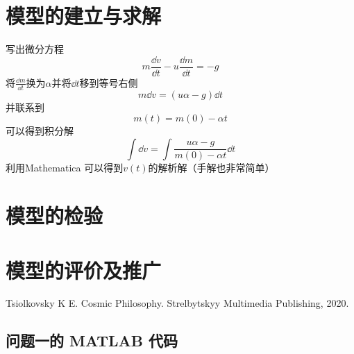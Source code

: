 \documentclass{JXUSTmodeling}
\begin{document}
\section{模型的建立与求解}\label{sec:5}
写出微分方程
\begin{equation}
    m\frac{\dd v}{\dd t} - u\frac{\dd m}{\dd t} = -g
\end{equation}
将$\frac{\dd m}{\dd t}$换为$\alpha$并将$\dd t$移到等号右侧
\begin{equation}
    m\dd v  = (u\alpha -g)\dd t
\end{equation}
并联系到
\begin{equation}
    m(t) = m(0) - \alpha t
\end{equation}
可以得到积分解
\begin{equation}
    \int \dd v = \int \frac{u\alpha - g}{m(0) - \alpha t} \dd t
\end{equation}
利用Mathematica 可以得到$v(t)$的解析解（手解也非常简单）
\section{模型的检验}\label{sec:6}

\section{模型的评价及推广}\label{sec:7}

\begin{thebibliography}{99}
  Tsiolkovsky K E. Cosmic Philosophy. Strelbytskyy Multimedia Publishing, 2020.
\end{thebibliography}

\begin{appendixx}
  \section{问题一的 MATLAB 代码}
\end{appendixx}
\end{document}
